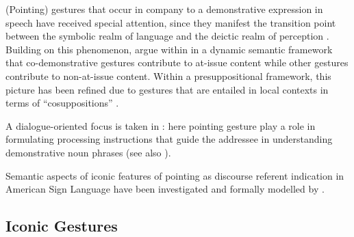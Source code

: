 \documentclass[output=paper]{langsci/langscibook}
\begin{document}
(Pointing) gestures that occur in company to a demonstrative expression in speech have received special attention, since they manifest the transition point between the symbolic realm of language and the deictic realm of perception \citep{Levinson:2008,Fricke:2012}.
%
Building on this phenomenon, \citet{Ebert:2014:a} argue within in a dynamic semantic framework that co-demonstrative gestures  contribute to at-issue content while other gestures %
contribute to non-at-issue content.
%
Within a presuppositional framework, this picture has been refined due to gestures that are entailed in local contexts in terms of \enquote{cosuppositions} \citet{Schlenker:2018}.


A dialogue-oriented focus is taken in \citet{Luecking:2018:a}: here pointing gesture play a role in formulating processing instructions that guide the addressee in understanding demonstrative noun phrases (see also ).  


Semantic aspects of iconic features of pointing as discourse referent indication in American Sign Language have been investigated and formally modelled by \citet{Schlenker:Lamberton:Santoro:2013,Schlenker:2014}.
 



\subsection{Iconic Gestures}
\label{sec:iconic-gestures}
\end{document}
